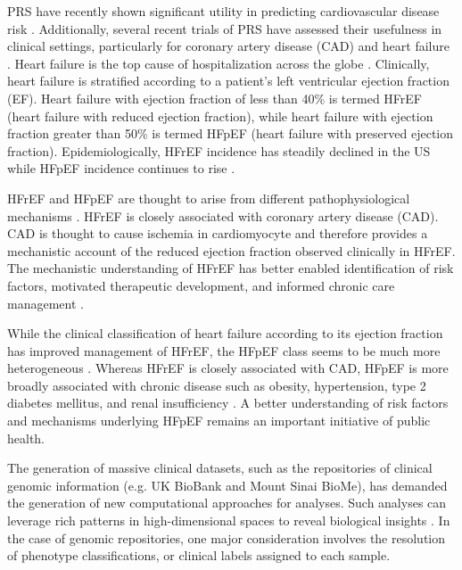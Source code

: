 \documentclass[11pt]{article}  %
\begin{document}
\hspace{10mm}PRS have recently shown significant utility in predicting cardiovascular disease risk \cite{sun_polygenic_2021}. Additionally, several recent trials of PRS have assessed their usefulness in clinical settings, particularly for coronary artery disease (CAD) and heart failure \cite{levin_michael_g_polygenic_2020}. Heart failure is the top cause of hospitalization across the globe \cite{simmonds_cellular_2020}. Clinically, heart failure is stratified according to a patient’s left ventricular ejection fraction (EF). Heart failure with ejection fraction of less than 40\% is termed HFrEF (heart failure with reduced ejection fraction), while heart failure with ejection fraction greater than 50\% is termed HFpEF (heart failure with preserved ejection fraction). Epidemiologically, HFrEF incidence has steadily declined in the US while HFpEF incidence continues to rise \cite{tsao_temporal_2018}.

\hspace{10mm}HFrEF and HFpEF are thought to arise from different pathophysiological mechanisms \cite{kitzman_pathophysiological_2002}. HFrEF is closely associated with coronary artery disease (CAD). CAD is thought to cause ischemia in cardiomyocyte and therefore provides a mechanistic account of the reduced ejection fraction observed clinically in HFrEF. The mechanistic understanding of HFrEF has better enabled identification of risk factors, motivated therapeutic development, and informed chronic care management \cite{kass_david_a_what_2004}. 

\hspace{10mm}While the clinical classification of heart failure according to its ejection fraction has improved management of HFrEF, the HFpEF class seems to be much more heterogeneous \cite{kass_david_a_what_2004}. Whereas HFrEF is closely associated with CAD, HFpEF is more broadly associated with chronic disease such as obesity, hypertension, type 2 diabetes mellitus, and renal insufficiency \cite{ergatoudes_non-cardiac_2019}. A better understanding of risk factors and mechanisms underlying HFpEF remains an important initiative of public health.

\hspace{10mm}The generation of massive clinical datasets, such as the repositories of clinical genomic information (e.g. UK BioBank and Mount Sinai BioMe), has demanded the generation of new computational approaches for analyses. Such analyses can leverage rich patterns in high-dimensional spaces to reveal biological insights \cite{nicolau_topology_2011-1}. In the case of genomic repositories, one major consideration involves the resolution of phenotype classifications, or clinical labels assigned to each sample. 
\end{document}

